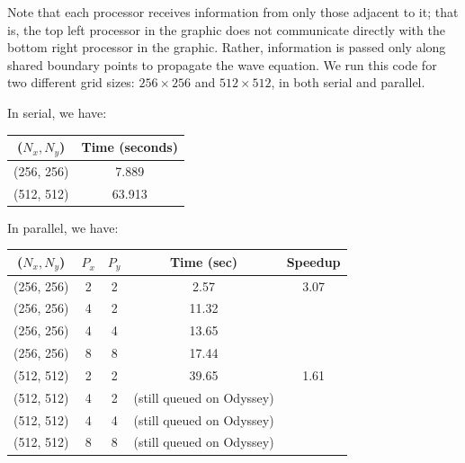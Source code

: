 \documentclass[letterpaper,12pt]{article}
\begin{document}
Note that each processor receives information from only those adjacent to it; that is, the top left processor in the graphic does not communicate directly with the bottom right processor in the graphic. Rather, information is passed only along shared boundary points to propagate the wave equation. We run this code for two different grid sizes: $256\times 256$ and $512\times 512$, in both serial and parallel.

In serial, we have:

\begin{center}
\begin{tabular}{|c|c|} \hline
($N_x, N_y$) & Time (seconds)\\ \hline
(256, 256) & 7.889\\ \hline %
(512, 512) & 63.913\\ \hline %
\end{tabular}
\end{center}

In parallel, we have:

\begin{center}
\begin{tabular}{|c|c|c|c|c|} \hline
($N_x, N_y$) & $P_x$ & $P_y$ & Time (sec) & Speedup \\ \hline
(256, 256) & 2 & 2 & 2.57 & 3.07\\ \hline %
(256, 256) & 4 & 2 & 11.32 & \\ \hline %
(256, 256) & 4 & 4 & 13.65 & \\ \hline %
(256, 256) & 8 & 8 & 17.44 & \\ \hline %
(512, 512) & 2 & 2 & 39.65 & 1.61\\ \hline %
(512, 512) & 4 & 2 & (still queued on Odyssey)& \\ \hline
(512, 512) & 4 & 4 & (still queued on Odyssey)&\\ \hline %
(512, 512) & 8 & 8 & (still queued on Odyssey)&\\ \hline %
\end{tabular}
\end{center}
\end{document}
